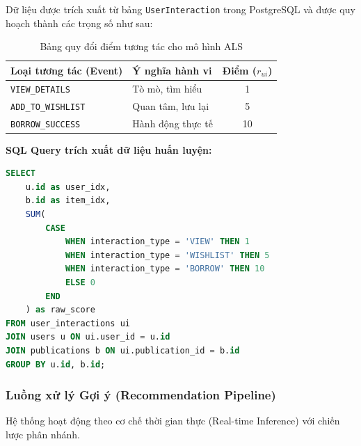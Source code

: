 Dữ liệu được trích xuất từ bảng \texttt{UserInteraction} trong PostgreSQL và được quy hoạch thành các trọng số như sau:

\begin{table}[H]
\centering
\begin{tabular}{@{}llc@{}}
\toprule
\textbf{Loại tương tác (Event)} & \textbf{Ý nghĩa hành vi} & \textbf{Điểm ($r_{ui}$)} \\ \midrule
\texttt{VIEW\_DETAILS} & Tò mò, tìm hiểu & 1 \\
\texttt{ADD\_TO\_WISHLIST} & Quan tâm, lưu lại & 5 \\
\texttt{BORROW\_SUCCESS} & Hành động thực tế & 10 \\ \bottomrule
\end{tabular}
\caption{Bảng quy đổi điểm tương tác cho mô hình ALS}
\label{tab:interaction_weights}
\end{table}

\textbf{SQL Query trích xuất dữ liệu huấn luyện:}
\begin{lstlisting}[language=SQL, caption=Truy vấn tổng hợp điểm tương tác User-Item]
SELECT 
    u.id as user_idx,
    b.id as item_idx,
    SUM(
        CASE 
            WHEN interaction_type = 'VIEW' THEN 1
            WHEN interaction_type = 'WISHLIST' THEN 5
            WHEN interaction_type = 'BORROW' THEN 10
            ELSE 0
        END
    ) as raw_score
FROM user_interactions ui
JOIN users u ON ui.user_id = u.id
JOIN publications b ON ui.publication_id = b.id
GROUP BY u.id, b.id;
\end{lstlisting}

\subsubsection{Luồng xử lý Gợi ý (Recommendation Pipeline)}

Hệ thống hoạt động theo cơ chế thời gian thực (Real-time Inference) với chiến lược phân nhánh.

